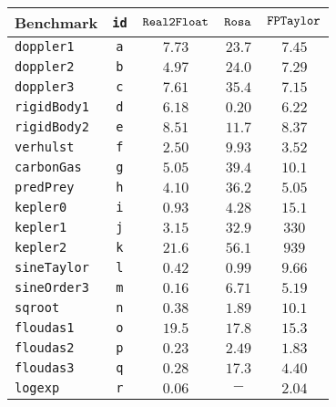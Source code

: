 \begin{tabular}{p{2.3cm}cccc}
\hline
\multirow{1}{*}{Benchmark} & \texttt{id} & $\mathtt{Real2Float}$ & $\mathtt{Rosa}$  & $\mathtt{FPTaylor}$   \\
\hline
\multirow{1}{*}{\texttt{doppler1}} & \texttt{a} &
$7.73$ & $23.7$ & $\mathbf{7.45}$\\
\multirow{1}{*}{\texttt{doppler2}} & \texttt{b} &
$\mathbf{4.97}$ & $24.0$ & $7.29$\\
\multirow{1}{*}{\texttt{doppler3}} & \texttt{c} &
$7.61$ & $35.4$ & $\mathbf{7.15}$\\
\multirow{1}{*}{\texttt{rigidBody1}} & \texttt{d} &
$6.18$ & $\mathbf{0.20}$ & $6.22$ \\
\multirow{1}{*}{\texttt{rigidBody2}} & \texttt{e} &
$8.51$ & $11.7$ & $\mathbf{8.37}$ \\
\multirow{1}{*}{\texttt{verhulst}} & \texttt{f} &
$\mathbf{2.50}$ & $9.93$ & $3.52$\\
\multirow{1}{*}{\texttt{carbonGas}} & \texttt{g} &
$\mathbf{5.05}$ & $39.4$ & $10.1$\\
\multirow{1}{*}{\texttt{predPrey}} & \texttt{h} &
$\mathbf{4.10}$ & $36.2$ & $5.05$\\
\multirow{1}{*}{\texttt{kepler0}} & \texttt{i} &
$\mathbf{0.93}$ & $4.28$ & $15.1$\\
\multirow{1}{*}{\texttt{kepler1}} & \texttt{j} &
$\mathbf{3.15}$ & $32.9$ & $330$\\
\multirow{1}{*}{\texttt{kepler2}} & \texttt{k} &
$\mathbf{21.6}$ & $56.1$ & $939$\\
\multirow{1}{*}{\texttt{sineTaylor}} & \texttt{l} &
$\mathbf{0.42}$ & $0.99$ & $9.66$ \\
\multirow{1}{*}{\texttt{sineOrder3}} & \texttt{m} &
$\mathbf{0.16}$ & $6.71$ & $5.19$\\
\multirow{1}{*}{\texttt{sqroot}} & \texttt{n} &
$\mathbf{0.38}$ & $1.89$ & $10.1$\\
\multirow{1}{*}{\texttt{floudas1}} & \texttt{o} &
$19.5$ & $17.8$ & $\mathbf{15.3}$\\
\multirow{1}{*}{\texttt{floudas2}} & \texttt{p} &
$\mathbf{0.23}$ & $2.49$ & $1.83$\\
\multirow{1}{*}{\texttt{floudas3}} & \texttt{q} &
$\mathbf{0.28}$ & $17.3$ & $4.40$\\
\multirow{1}{*}{\texttt{logexp}} & \texttt{r} &
$\mathbf{0.06}$ & $-$ & $2.04$\\

\end{tabular}
